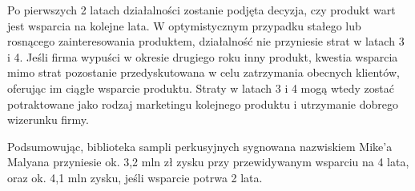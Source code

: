 \documentclass[12pt]{article}
\begin{document}
Po pierwszych 2 latach działalności zostanie podjęta decyzja, czy produkt wart jest wsparcia na kolejne lata.
W optymistycznym przypadku stałego lub rosnącego zainteresowania produktem, działalność nie przyniesie strat w latach 3 i 4.
Jeśli firma wypuści w okresie drugiego roku inny produkt, kwestia wsparcia mimo strat pozostanie przedyskutowana w celu zatrzymania obecnych klientów, oferując im ciągłe wsparcie produktu.
Straty w latach 3 i 4 mogą wtedy zostać potraktowane jako rodzaj marketingu kolejnego produktu i utrzymanie dobrego wizerunku firmy.

Podsumowując, biblioteka sampli perkusyjnych sygnowana nazwiskiem Mike'a Malyana przyniesie ok. 3,2 mln zł zysku przy przewidywanym wsparciu na 4 lata, oraz ok. 4,1 mln zysku, jeśli wsparcie potrwa 2 lata.


\begin{table}[h!]
 \begin{center}
 \caption{Jednorazowe wydatki na wytworzenie produktu}
 \label{table:jednorazowe}
 \end{center}
\end{table}
\end{document}
